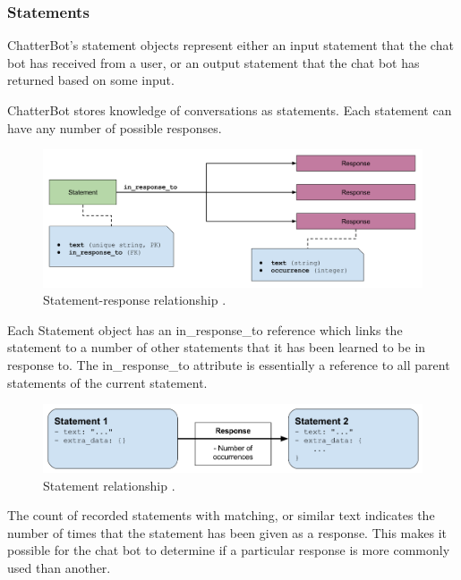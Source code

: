 \documentclass[12pt,a4paper]{article}
\newcommand{\captionstyle}[1] {
    \small{#1}
}
\begin{document}
\subsubsection{Statements}
ChatterBot’s statement objects represent either an input statement that the chat bot has received from a user, or an output statement that the chat bot has returned based on some input.

ChatterBot stores knowledge of conversations as statements. Each statement can have any number of possible responses.

\begin{figure}[!htb]%
    \centering
    \includegraphics[width=1.0\columnwidth]{statement-response-relationship}%
    \caption{\captionstyle{Statement-response relationship \cite{Chatterbot:online}.}}%
    \label{fig:statement-response-relationship}%
\end{figure}

Each Statement object has an in\_response\_to reference which links the statement to a number of other statements that it has been learned to be in response to. The in\_response\_to attribute is essentially a reference to all parent statements of the current statement.

\begin{figure}[!htb]%
    \centering
    \includegraphics[width=1.0\columnwidth]{statement-relationship}%
    \caption{\captionstyle{Statement relationship \cite{Chatterbot:online}.}}%
    \label{fig:statement-relationship}%
\end{figure}

The count of recorded statements with matching, or similar text indicates the number of times that the statement has been given as a response. This makes it possible for the chat bot to determine if a particular response is more commonly used than another.
\end{document}
